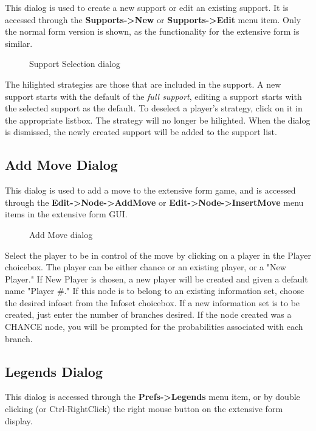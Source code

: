 \documentclass[12pt]{report}
\begin{document}
This dialog is used to create a new support or edit an existing
support.  It is accessed through the {\bf Supports->New} or {\bf
Supports->Edit} menu item.  Only the normal form version is shown, as
the functionality for the extensive form is similar.

\begin{figure}
\caption{Support Selection dialog}\label{fig_support}
\end{figure}

The hilighted strategies are those that are included in the support.
A new support starts with the default of the {\em full support},
editing a support starts with the selected support as the default.  To
deselect a player's strategy, click on it in the appropriate listbox.
The strategy will no longer be hilighted.  When the dialog is
dismissed, the newly created support will be added to the support
list.

\subsection{Add Move Dialog}\label{AddMove}

This dialog is used to add a move to the extensive form game, and is
accessed through the {\bf Edit->Node->AddMove} or {\bf 
Edit->Node->InsertMove} menu items in the extensive form GUI.  

\begin{figure}
\caption{Add Move dialog}\label{fig_addmove}
\end{figure}

Select the player to be in control of the move by clicking on a player
in the Player choicebox.  The player can be either chance or an
existing player, or a "New Player."  If New Player is chosen, a new
player will be created and given a default name "Player \#."  If this
node is to belong to an existing information set, choose the desired
infoset from the Infoset choicebox.  If a new information set is to be
created, just enter the number of branches desired.  If the node
created was a CHANCE node, you will be prompted for the
probabilities associated with each branch.

\subsection{Legends Dialog}\label{Legends}

This dialog is accessed through the {\bf Prefs->Legends} menu item, or
by double clicking (or Ctrl-RightClick) the right mouse button on the
extensive form display.
\end{document}
